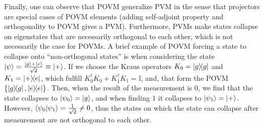 Finally, one can observe that POVM generalize PVM in the sense that projectors are special cases of POVM elements (adding self-adjoint property and orthogonality to POVM gives a PVM). Furthermore, PVMs make states collapse on eigenstates that are necessarily orthogonal to each other, which is not necessarily the case for POVMs\@. A brief example of POVM forcing a state to collapse onto ``non-orthogonal states'' is when considering the state $\ket{\psi}=\frac{\ket{g}+\ket{e}}{\sqrt{2}}\equiv\ket{+}$. If we choose the Kraus operators $K_0=\ketbra{g}$ and $K_1=\ketbra{+}{e}$, which fulfill $K_0^\dagger K_0+K_1^\dagger K_1=\mathbb{I}$, and, that form the POVM $\qty{\ketbra{g},\ketbra{e}}$. Then, when the result of the measurement is $0$, we find that the state collapses to $\ket{\psi_0}=\ket{g}$, and when finding $1$ it collapses to $\ket{\psi_1}=\ket{+}$. However, $\braket{\psi_0}{\psi_1}=\frac{1}{\sqrt{2}}\neq 0$, thus the states on which the state can collapse after measurement are not orthogonal to each other.
